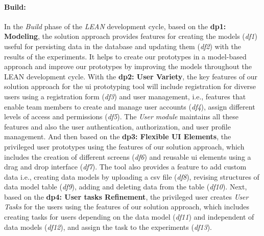 \paragraph{Build:}
In the \textit{Build} phase of the \textit{LEAN} development cycle, based on the \textbf{\ac{dp}1: Modeling}, the solution approach provides features for creating the models (\textit{\ac{df}1}) useful for persisting data in the database and updating them (\textit{\ac{df}2}) with the results of the experiments.
It helps to create our prototypes in a model-based approach and improve our prototypes by improving the models throughout the LEAN development cycle.
With the \textbf{\ac{dp}2: User Variety}, the key features of our solution approach for the \ac{ui} prototyping tool will include registration for diverse users using a registration form (\textit{\ac{df}3}) and user management, i.e., features that enable team members to create and manage user accounts (\textit{\ac{df}4}), assign different levels of access and permissions (\textit{\ac{df}5}).
The \textit{User module} maintains all these features and also the user authentication, authorization, and user profile management.
And then based on the \textbf{\ac{dp}3: Flexible UI Elements}, the privileged user prototypes using the features of our solution approach, which includes the creation of different screens (\textit{\ac{df}6}) and reusable \ac{ui} elements using a drag and drop interface (\textit{\ac{df}7}). 
The tool also provides a feature to add custom data i.e., creating data models by uploading a \ac{csv} file (\textit{\ac{df}8}), revising structures of data model table (\textit{\ac{df}9}), adding and deleting data from the table (\textit{\ac{df}10}).
Next, based on the \textbf{\ac{dp}4: User tasks Refinement}, the privileged user creates \textit{User Tasks} for the users using the features of our solution approach, which includes creating tasks for users depending on the data model (\textit{\ac{df}11}) and independent of data models (\textit{\ac{df}12}), and assign the task to the experiments (\textit{\ac{df}13}).

